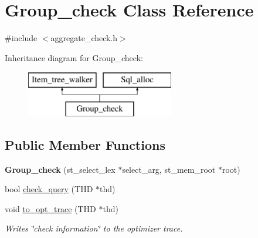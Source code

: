 \hypertarget{classGroup__check}{}\section{Group\+\_\+check Class Reference}
\label{classGroup__check}


{\ttfamily \#include $<$aggregate\+\_\+check.\+h$>$}

Inheritance diagram for Group\+\_\+check\+:\begin{figure}[H]
\begin{center}
\leavevmode
\includegraphics[height=2.000000cm]{classGroup__check}
\end{center}
\end{figure}
\subsection*{Public Member Functions}
\begin{DoxyCompactItemize}
\item 
\mbox{\label{classGroup__check_ad48e4d86d76d0f6c1d761c45ce72b030}} 
{\bfseries Group\+\_\+check} (st\+\_\+select\+\_\+lex $\ast$select\+\_\+arg, st\+\_\+mem\+\_\+root $\ast$root)
\item 
bool \mbox{\hyperlink{group__AGGREGATE__CHECKS_ga85f98a122e6f9accf528534acb5db686}{check\+\_\+query}} (T\+HD $\ast$thd)
\item 
void \mbox{\hyperlink{group__AGGREGATE__CHECKS_ga97e11f17193e6ad1adff12b0ff2c3af6}{to\+\_\+opt\+\_\+trace}} (T\+HD $\ast$thd)
\begin{DoxyCompactList}\small\item\em Writes \char`\"{}check information\char`\"{} to the optimizer trace. \end{DoxyCompactList}\end{DoxyCompactItemize}
